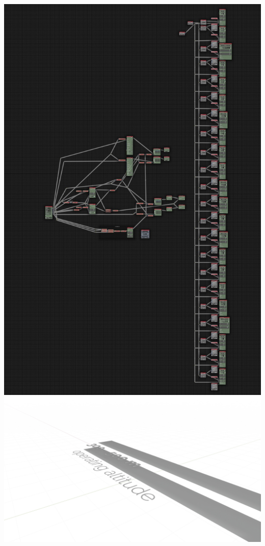 \includegraphics[width=\textwidth]{gfx/post/call-out.jpg}
\includegraphics[width=\textwidth]{gfx/post/call-out2.jpg}


